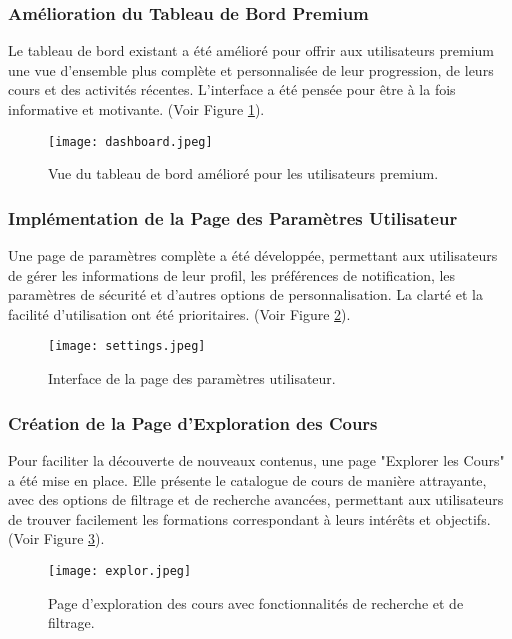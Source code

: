 \documentclass[12pt, a4paper]{article}
\begin{document}
\subsubsection{Amélioration du Tableau de Bord Premium}
Le tableau de bord existant a été amélioré pour offrir aux utilisateurs premium une vue d'ensemble plus complète et personnalisée de leur progression, de leurs cours et des activités récentes. L'interface a été pensée pour être à la fois informative et motivante. (Voir Figure \ref{fig:dashboard_premium}).

\begin{figure}[htbp]
  \centering
  \texttt{[image: dashboard.jpeg]} %
  \caption{Vue du tableau de bord amélioré pour les utilisateurs premium.}
  \label{fig:dashboard_premium}
\end{figure}

\subsubsection{Implémentation de la Page des Paramètres Utilisateur}
Une page de paramètres complète a été développée, permettant aux utilisateurs de gérer les informations de leur profil, les préférences de notification, les paramètres de sécurité et d'autres options de personnalisation. La clarté et la facilité d'utilisation ont été prioritaires. (Voir Figure \ref{fig:settings_page}).

\begin{figure}[htbp]
  \centering
  \texttt{[image: settings.jpeg]} %
  \caption{Interface de la page des paramètres utilisateur.}
  \label{fig:settings_page}
\end{figure}

\subsubsection{Création de la Page d'Exploration des Cours}
Pour faciliter la découverte de nouveaux contenus, une page "Explorer les Cours" a été mise en place. Elle présente le catalogue de cours de manière attrayante, avec des options de filtrage et de recherche avancées, permettant aux utilisateurs de trouver facilement les formations correspondant à leurs intérêts et objectifs. (Voir Figure \ref{fig:explore_courses_page}).

\begin{figure}[htbp]
  \centering
  \texttt{[image: explor.jpeg]} %
  \caption{Page d'exploration des cours avec fonctionnalités de recherche et de filtrage.}
  \label{fig:explore_courses_page}
\end{figure}
\end{document}
